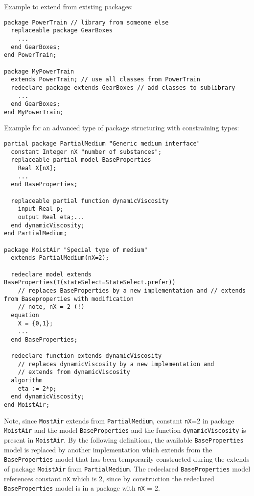 \begin{nonnormative}
Example to extend from existing packages:
\begin{lstlisting}[language=modelica]
package PowerTrain // library from someone else
  replaceable package GearBoxes
    ...
  end GearBoxes;
end PowerTrain;

package MyPowerTrain
  extends PowerTrain; // use all classes from PowerTrain
  redeclare package extends GearBoxes // add classes to sublibrary
    ...
  end GearBoxes;
end MyPowerTrain;
\end{lstlisting}

Example for an advanced type of package structuring with constraining types:
\begin{lstlisting}[language=modelica]
partial package PartialMedium "Generic medium interface"
  constant Integer nX "number of substances";
  replaceable partial model BaseProperties
    Real X[nX];
    ...
  end BaseProperties;

  replaceable partial function dynamicViscosity
    input Real p;
    output Real eta;...
  end dynamicViscosity;
end PartialMedium;

package MoistAir "Special type of medium"
  extends PartialMedium(nX=2);

  redeclare model extends BaseProperties(T(stateSelect=StateSelect.prefer))
    // replaces BaseProperties by a new implementation and // extends from Baseproperties with modification
    // note, nX = 2 (!)
  equation
    X = {0,1};
    ...
  end BaseProperties;

  redeclare function extends dynamicViscosity
    // replaces dynamicViscosity by a new implementation and
    // extends from dynamicViscosity
  algorithm
    eta := 2*p;
  end dynamicViscosity;
end MoistAir;
\end{lstlisting}

Note, since \lstinline!MostAir! extends from \lstinline!PartialMedium!,
constant \lstinline!nX!=2 in package \lstinline!MoistAir! and the model
\lstinline!BaseProperties! and the function \lstinline!dynamicViscosity! is present
in \lstinline!MoistAir!. By the following definitions, the available
\lstinline!BaseProperties! model is replaced by another implementation which
extends from the \lstinline!BaseProperties! model that has been temporarily
constructed during the extends of package \lstinline!MoistAir! from
\lstinline!PartialMedium!. The redeclared \lstinline!BaseProperties! model
references constant \lstinline!nX! which is 2, since by construction the
redeclared \lstinline!BaseProperties! model is in a package with \lstinline!nX! = 2.


\end{nonnormative}
